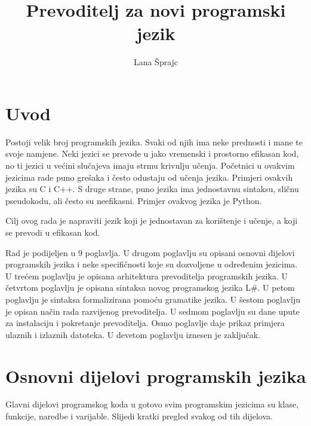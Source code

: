 \documentclass[times, utf8, zavrsni]{fer}
\begin{document}

\title{Prevoditelj za novi programski jezik}

\author{Lana Šprajc}



\zahvala{}

\tableofcontents

\chapter{Uvod}
Postoji velik broj programskih jezika. Svaki od njih ima neke prednosti i mane te svoje namjene.
Neki jezici se prevode u jako vremenski i prostorno efikasan kod, no ti jezici u većini slučajeva imaju strmu krivulju učenja. Početnici u ovakvim jezicima
rade puno grešaka i često odustaju od učenja jezika. Primjeri ovakvih jezika su C i C++. S druge strane, puno jezika ima jednostavnu sintaksu, sličnu pseudokodu, ali
često su neefikasni. Primjer ovakvog jezika je Python.

Cilj ovog rada je napraviti jezik koji je jednostavan za korištenje i učenje, a koji se prevodi u efikasan kod.

Rad je podijeljen u 9 poglavlja. U drugom poglavlju su opisani osnovni dijelovi programskih jezika i neke specifičnosti koje su dozvoljene u određenim jezicima.
U trećem poglavlju je opisana arhitektura prevoditelja programskih jezika. U četvrtom poglavlju je opisana sintaksa novog programskog jezika L\#. U petom poglavlju
je sintaksa formalizirana pomoću gramatike jezika. U šestom poglavlju je opisan način rada razvijenog prevoditelja. U sedmom poglavlju su dane upute za instalaciju
i pokretanje prevoditelja. Osmo poglavlje daje prikaz primjera ulaznih i izlaznih datoteka. U devetom poglavlju iznesen je zaključak.

\chapter{Osnovni dijelovi programskih jezika}
Glavni dijelovi programskog koda u gotovo svim programskim jezicima su klase, funkcije, naredbe i varijable. Slijedi kratki pregled svakog od tih dijelova.
\end{document}
